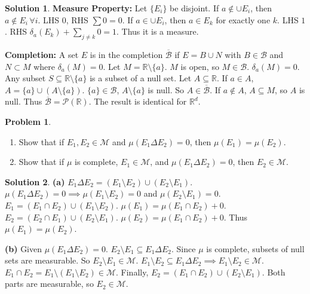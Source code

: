 \documentclass[11pt]{article}
\theoremstyle{definition}
\newtheorem{problem}{Problem}
\newtheorem*{solution}{Solution}
\newcommand{\R}{\mathbb{R}}
\newcommand{\B}{\mathcal{B}}
\newcommand{\M}{\mathcal{M}}
\newcommand{\Pset}{\mathcal{P}}
\begin{document}
\begin{solution}
\textbf{Measure Property:}
Let $\{E_i\}$ be disjoint.
If $a \notin \cup E_i$, then $a \notin E_i \, \forall i$. LHS $0$, RHS $\sum 0 = 0$.
If $a \in \cup E_i$, then $a \in E_k$ for exactly one $k$. LHS $1$. RHS $\delta_a(E_k) + \sum_{j \ne k} 0 = 1$.
Thus it is a measure.

\textbf{Completion:}
A set $E$ is in the completion $\overline{\B}$ if $E = B \cup N$ with $B \in \B$ and $N \subset M$ where $\delta_a(M)=0$.
Let $M = \R \setminus \{a\}$. $M$ is open, so $M \in \B$. $\delta_a(M) = 0$.
Any subset $S \subseteq \R \setminus \{a\}$ is a subset of a null set.
Let $A \subseteq \R$.
If $a \in A$, $A = \{a\} \cup (A \setminus \{a\})$. $\{a\} \in \B$, $A \setminus \{a\}$ is null. So $A \in \overline{\B}$.
If $a \notin A$, $A \subseteq M$, so $A$ is null.
Thus $\overline{\B} = \Pset(\R)$.
The result is identical for $\R^d$.
\end{solution}

\hrulefill

\begin{problem}
\begin{enumerate}[label=(\alph*)]
    \item Show that if $E_1, E_2 \in \M$ and $\mu(E_1 \Delta E_2)=0$, then $\mu(E_1) = \mu(E_2)$.
    \item Show that if $\mu$ is complete, $E_1 \in \M$, and $\mu(E_1 \Delta E_2)=0$, then $E_2 \in \M$.
\end{enumerate}
\end{problem}

\begin{solution}
\textbf{(a)}
$E_1 \Delta E_2 = (E_1 \setminus E_2) \cup (E_2 \setminus E_1)$.
$\mu(E_1 \Delta E_2) = 0 \implies \mu(E_1 \setminus E_2) = 0$ and $\mu(E_2 \setminus E_1) = 0$.
$E_1 = (E_1 \cap E_2) \cup (E_1 \setminus E_2)$.
$\mu(E_1) = \mu(E_1 \cap E_2) + 0$.
$E_2 = (E_2 \cap E_1) \cup (E_2 \setminus E_1)$.
$\mu(E_2) = \mu(E_1 \cap E_2) + 0$.
Thus $\mu(E_1) = \mu(E_2)$.

\textbf{(b)}
Given $\mu(E_1 \Delta E_2)=0$.
$E_2 \setminus E_1 \subseteq E_1 \Delta E_2$. Since $\mu$ is complete, subsets of null sets are measurable. So $E_2 \setminus E_1 \in \M$.
$E_1 \setminus E_2 \subseteq E_1 \Delta E_2 \implies E_1 \setminus E_2 \in \M$.
$E_1 \cap E_2 = E_1 \setminus (E_1 \setminus E_2) \in \M$.
Finally, $E_2 = (E_1 \cap E_2) \cup (E_2 \setminus E_1)$. Both parts are measurable, so $E_2 \in \M$.
\end{solution}
\end{document}
